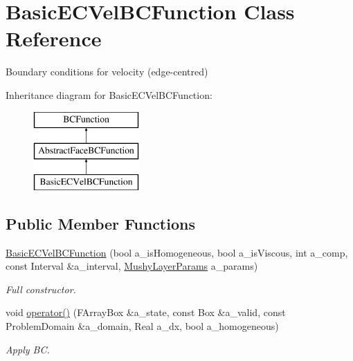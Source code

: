 \hypertarget{class_basic_e_c_vel_b_c_function}{\section{Basic\-E\-C\-Vel\-B\-C\-Function Class Reference}
\label{class_basic_e_c_vel_b_c_function}
}


Boundary conditions for velocity (edge-\/centred)  


Inheritance diagram for Basic\-E\-C\-Vel\-B\-C\-Function\-:\begin{figure}[H]
\begin{center}
\leavevmode
\includegraphics[height=3.000000cm]{class_basic_e_c_vel_b_c_function}
\end{center}
\end{figure}
\subsection*{Public Member Functions}
\begin{DoxyCompactItemize}
\item 
\hypertarget{class_basic_e_c_vel_b_c_function_a8ae38232cd83d5af7f7c2a2ca25bc714}{\hyperlink{class_basic_e_c_vel_b_c_function_a8ae38232cd83d5af7f7c2a2ca25bc714}{Basic\-E\-C\-Vel\-B\-C\-Function} (bool a\-\_\-is\-Homogeneous, bool a\-\_\-is\-Viscous, int a\-\_\-comp, const Interval \&a\-\_\-interval, \hyperlink{class_mushy_layer_params}{Mushy\-Layer\-Params} a\-\_\-params)}\label{class_basic_e_c_vel_b_c_function_a8ae38232cd83d5af7f7c2a2ca25bc714}

\begin{DoxyCompactList}\small\item\em Full constructor. \end{DoxyCompactList}\item 
\hypertarget{class_basic_e_c_vel_b_c_function_a4dc48ed586c036b77c1b85efbdfc4f92}{void \hyperlink{class_basic_e_c_vel_b_c_function_a4dc48ed586c036b77c1b85efbdfc4f92}{operator()} (F\-Array\-Box \&a\-\_\-state, const Box \&a\-\_\-valid, const Problem\-Domain \&a\-\_\-domain, Real a\-\_\-dx, bool a\-\_\-homogeneous)}\label{class_basic_e_c_vel_b_c_function_a4dc48ed586c036b77c1b85efbdfc4f92}

\begin{DoxyCompactList}\small\item\em Apply B\-C. \end{DoxyCompactList}\end{DoxyCompactItemize}
